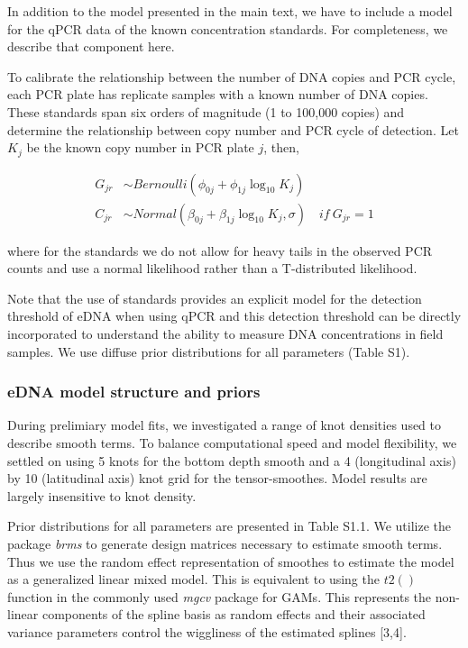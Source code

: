 \documentclass[
]{article}
\begin{document}
In addition to the model presented in the main text, we have to include
a model for the qPCR data of the known concentration standards. For
completeness, we describe that component here.

To calibrate the relationship between the number of DNA copies and PCR
cycle, each PCR plate has replicate samples with a known number of DNA
copies. These standards span six orders of magnitude (1 to 100,000
copies) and determine the relationship between copy number and PCR cycle
of detection. Let \(K_j\) be the known copy number in PCR plate \(j\),
then,

\begin{align}
  G_{jr} &\sim Bernoulli(\phi_{0j}+\phi_{1j}\log_{10}K_{j})\\
  C_{jr} &\sim Normal(\beta_{0j}+\beta_{1j}\log_{10}K_{j},\sigma) \quad  if \: G_{jr} =1
\end{align}

where for the standards we do not allow for heavy tails in the observed
PCR counts and use a normal likelihood rather than a T-distributed
likelihood.

Note that the use of standards provides an explicit model for the
detection threshold of eDNA when using qPCR and this detection threshold
can be directly incorporated to understand the ability to measure DNA
concentrations in field samples. We use diffuse prior distributions for
all parameters (Table S1).

\hypertarget{edna-model-structure-and-priors}{%
\subsubsection{eDNA model structure and
priors}\label{edna-model-structure-and-priors}}

During prelimiary model fits, we investigated a range of knot densities
used to describe smooth terms. To balance computational speed and model
flexibility, we settled on using 5 knots for the bottom depth smooth and
a 4 (longitudinal axis) by 10 (latitudinal axis) knot grid for the
tensor-smoothes. Model results are largely insensitive to knot density.

Prior distributions for all parameters are presented in Table S1.1. We
utilize the package \emph{brms} to generate design matrices necessary to
estimate smooth terms. Thus we use the random effect representation of
smoothes to estimate the model as a generalized linear mixed model. This
is equivalent to using the \(t2()\) function in the commonly used
\emph{mgcv} package for GAMs. This represents the non-linear components
of the spline basis as random effects and their associated variance
parameters control the wiggliness of the estimated splines {[}3,4{]}.
\end{document}
